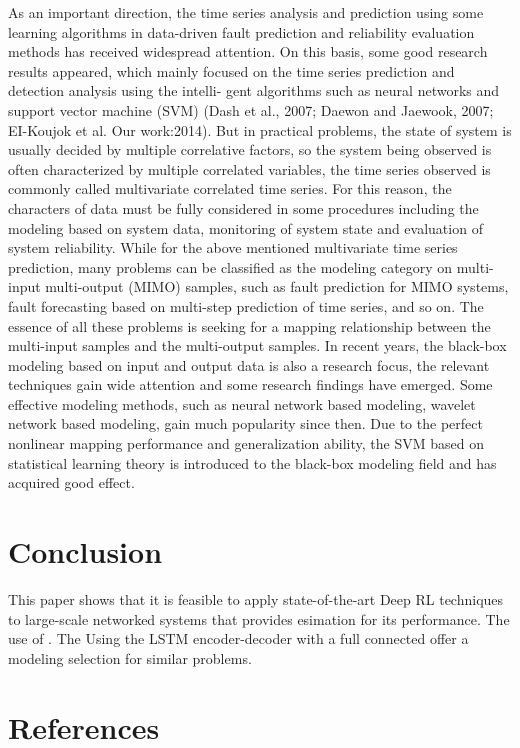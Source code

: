 \documentclass[review]{elsarticle}
\begin{document}
As an important direction, the time series analysis and prediction
using some learning algorithms in data-driven fault prediction and
reliability evaluation methods has received widespread attention. On
this basis, some good research results appeared, which mainly focused
on the time series prediction and detection analysis using the intelli-
gent algorithms such as neural networks and support vector machine
(SVM) (Dash et al., 2007; Daewon and Jaewook, 2007; EI-Koujok et al.
Our work:2014). But in practical problems, the state of system is usually decided by multiple correlative factors, so the system being observed is often characterized by multiple correlated variables, the time series observed is commonly called multivariate correlated time series. For this reason, the characters of data must be fully considered in some procedures including the modeling based on system data, monitoring of system state and evaluation of system reliability. While for the above mentioned multivariate time series prediction, many problems can be classified as the modeling category on multi-input multi-output (MIMO) samples, such as fault prediction for MIMO systems, fault forecasting based on multi-step prediction of time series, and so on. The essence of all these problems is seeking for a mapping relationship between the multi-input samples and the multi-output samples. In recent years, the black-box modeling based on input and output data is also a research focus, the relevant techniques gain wide attention and some research findings have emerged. Some effective modeling methods, such as neural network based modeling, wavelet network based modeling, gain much popularity since then. Due to the perfect nonlinear mapping performance and generalization ability, the SVM based on statistical learning theory is introduced to the black-box modeling field and has acquired good effect.
    \cite{Wang2017}

\section{Conclusion}

This paper shows that it is feasible to apply state-of-the-art Deep RL techniques to large-scale networked systems that provides esimation for its performance. The use of . The Using the LSTM encoder-decoder with a full connected  offer a modeling selection for similar problems.
\section*{References}



\end{document}

